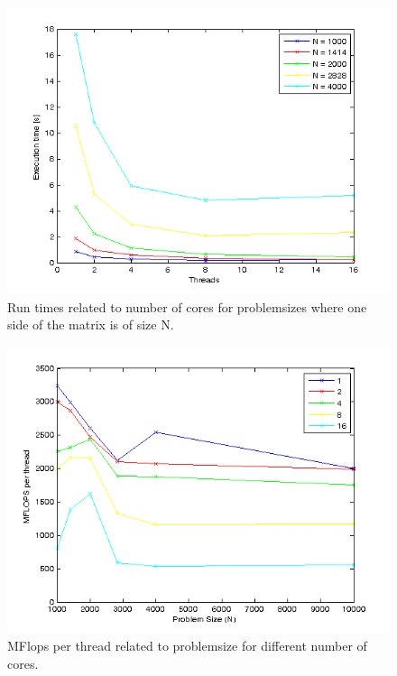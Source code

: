 \documentclass[a4paper,11pt]{article}
\begin{document}
\begin{figure}[!h]
  \caption{Run times related to number of cores for problemsizes where one side of the matrix is of size N.}
  \label{runtime_vs_cores}
  \includegraphics[scale=0.9]{./plots/lab3_exec_t_threads.png}
\end{figure}

\begin{figure}[!h]
  \caption{MFlops per thread related to problemsize for different number of cores.}
  \label{flops_thread_vs_n}
  \includegraphics[scale=0.9]{./plots/lab3_mflops_per_thread_n.png}
\end{figure}
\clearpage
\end{document}
